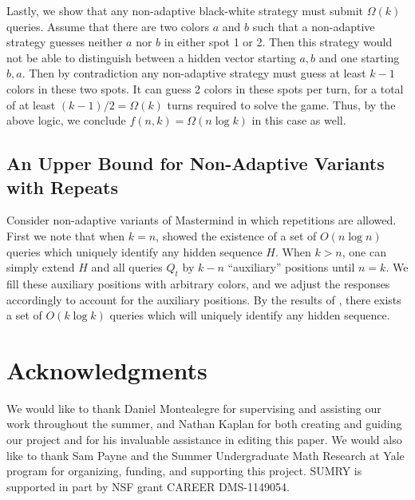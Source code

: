 \documentclass[12pt, a4paper]{article}
\begin{document}
Lastly, we show that any non-adaptive black-white strategy must submit $\Omega(k)$ queries. Assume that there are two colors $a$ and $b$ such that a non-adaptive strategy guesses neither $a$ nor $b$ in either spot 1 or 2. Then this strategy would not be able to distinguish between a hidden vector starting $a,b$ and one starting $b,a$. Then by contradiction any non-adaptive strategy must guess at least $k-1$ colors in these two spots. It can guess 2 colors in these spots per turn, for a total of at least $(k-1)/2 = \Omega(k)$ turns required to solve the game. Thus, by the above logic, we conclude $f(n,k) = \Omega(n \log k)$ in this case as well.

\subsection{An Upper Bound for Non-Adaptive Variants with Repeats}
Consider non-adaptive variants of Mastermind in which repetitions are allowed. First we note that when $k=n$, \cite{DS13} showed the existence of a set of $O(n \log n)$ queries which uniquely identify any hidden sequence $H$. When $k > n$, one can simply extend $H$ and all queries $Q_t$ by $k - n$ ``auxiliary'' positions until $n = k$. We fill these auxiliary positions with arbitrary colors, and we adjust the responses accordingly to account for the auxiliary positions. By the results of \cite{DS13}, there exists a set of $O(k \log k)$ queries which will uniquely identify any hidden sequence.

\section{Acknowledgments}
We would like to thank Daniel Montealegre for supervising and assisting our work throughout the summer, and Nathan Kaplan for both creating and guiding our project and for his invaluable assistance in editing this paper. 
 We would also like to thank Sam Payne and the Summer Undergraduate Math Research at Yale program for organizing, funding, and supporting this project. SUMRY is supported in part by NSF grant CAREER DMS-1149054.



\end{document}
